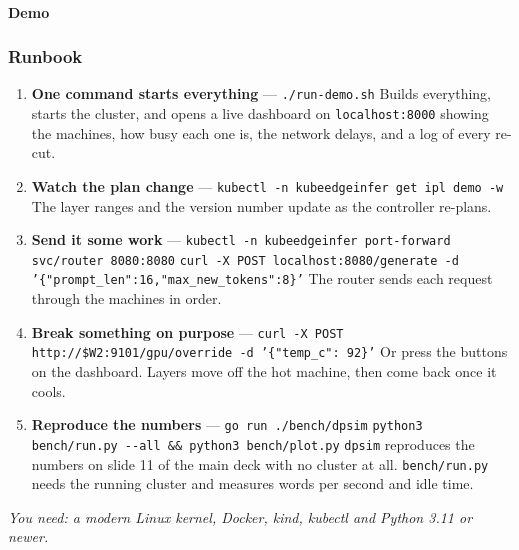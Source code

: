 \documentclass[aspectratio=169,11pt]{beamer}
\newcommand{\kefoot}[1]{\vfill{\scriptsize\itshape\color{kemuted}#1}}
\begin{document}
\begin{frame}[fragile,shrink=30]
  \framesubtitle{Demo}
  \frametitle{Runbook}
  \footnotesize
  \begin{enumerate}\itemsep0.55em
    \item \textbf{One command starts everything} ---
      \texttt{\small ./run-demo.sh}\newline
      {\scriptsize\color{kebody}Builds everything, starts the cluster, and opens
       a live dashboard on \texttt{localhost:8000} showing the machines, how busy
       each one is, the network delays, and a log of every re-cut.}
    \item \textbf{Watch the plan change} ---
      \texttt{\small kubectl -n kubeedgeinfer get ipl demo -w}\newline
      {\scriptsize\color{kebody}The layer ranges and the version number update as
       the controller re-plans.}
    \item \textbf{Send it some work} ---
      \texttt{\small kubectl -n kubeedgeinfer port-forward svc/router 8080:8080}\newline
      \texttt{\small curl -X POST localhost:8080/generate -d
       '\{"prompt\_len":16,"max\_new\_tokens":8\}'}\newline
      {\scriptsize\color{kebody}The router sends each request through the
       machines in order.}
    \item \textbf{Break something on purpose} ---
      \texttt{\small curl -X POST http://\$W2:9101/gpu/override -d
       '\{"temp\_c": 92\}'}\newline
      {\scriptsize\color{kebody}Or press the buttons on the dashboard. Layers
       move off the hot machine, then come back once it cools.}
    \item \textbf{Reproduce the numbers} ---
      \texttt{\small go run ./bench/dpsim}\newline
      \texttt{\small python3 bench/run.py -{}-all \&\& python3 bench/plot.py}\newline
      {\scriptsize\color{kebody}\texttt{dpsim} reproduces the numbers on slide
       11 of the main deck with no cluster at all. \texttt{bench/run.py} needs
       the running cluster and measures words per second and idle time.}
  \end{enumerate}
  \kefoot{You need: a modern Linux kernel, Docker, kind, kubectl and
          Python 3.11 or newer.}
\end{frame}
\end{document}
